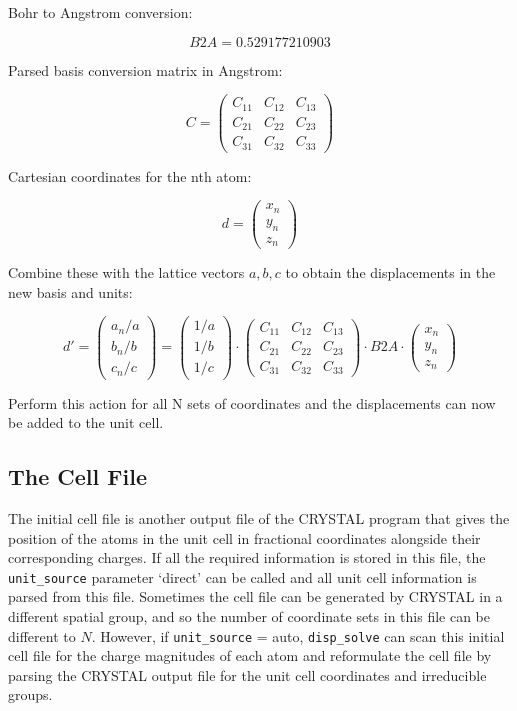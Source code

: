 \documentclass[10pt]{article}
\begin{document}
Bohr to Angstrom conversion:

$$
	B2A = 0.529177210903
$$

Parsed basis conversion matrix in Angstrom:

$$
C = \begin{pmatrix}
C_{11} & C_{12} & C_{13} \\
C_{21} & C_{22} & C_{23} \\
C_{31} & C_{32} & C_{33}
\end{pmatrix}
$$

Cartesian coordinates for the nth atom:

$$d = \begin{pmatrix}
x_n \\
y_n \\
z_n
\end{pmatrix}$$

Combine these with the lattice vectors $a,b,c$ to obtain the displacements in the new basis and units:

$$d' = \begin{pmatrix}
a_n/a \\
b_n/b \\
c_n/c
\end{pmatrix} =
\begin{pmatrix}
1/a \\
1/b \\
1/c
\end{pmatrix}\cdot
\begin{pmatrix}
C_{11} & C_{12} & C_{13} \\
C_{21} & C_{22} & C_{23} \\
C_{31} & C_{32} & C_{33}
\end{pmatrix} \cdot
B2A \cdot
\begin{pmatrix}
x_n \\
y_n \\
z_n
\end{pmatrix}$$

Perform this action for all N sets of coordinates and the displacements can now be added to the unit cell.
\subsection{The Cell File}

The initial cell file is another output file of the CRYSTAL program that gives the position of the atoms in the unit cell in fractional coordinates alongside their corresponding charges. If all the required information is stored in this file, the \texttt{unit\_source} parameter `direct' can be called and all unit cell information is parsed from this file. Sometimes the cell file can be generated by CRYSTAL in a different spatial group, and so the number of coordinate sets in this file can be different to $N$. However, if \texttt{unit\_source} = auto, \texttt{disp\_solve} can scan this initial cell file for the charge magnitudes of each atom and reformulate the cell file by parsing the CRYSTAL output file for the unit cell coordinates and irreducible groups.
\end{document}
